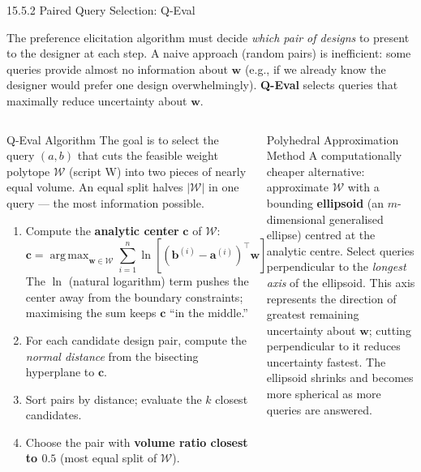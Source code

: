 \documentclass[aspectratio=169,10pt]{beamer}
\newcommand{\bw}{\mathbf{w}}
\newcommand{\ba}{\mathbf{a}}
\newcommand{\bb}{\mathbf{b}}
\DeclareMathOperator*{\argmax}{arg\,max}
\begin{document}
\begin{frame}[allowframebreaks]{15.5.2 Paired Query Selection: Q-Eval}

The preference elicitation algorithm must decide \emph{which pair of designs}
to present to the designer at each step.  A naive approach (random pairs) is
inefficient: some queries provide almost no information about $\bw$ (e.g., if
we already know the designer would prefer one design overwhelmingly).
\textbf{Q-Eval} selects queries that maximally reduce uncertainty about $\bw$.

\begin{columns}
\begin{block}{Q-Eval Algorithm}
  The goal is to select the query $(a, b)$ that cuts the feasible weight
  polytope $\mathcal{W}$ (script W) into two pieces of nearly equal volume.
  An equal split halves $|\mathcal{W}|$ in one query --- the most information
  possible.
  \begin{enumerate}
    \item Compute the \textbf{analytic center} $\mathbf{c}$ of $\mathcal{W}$:
    \[
      \mathbf{c} = \argmax_{\bw \in \mathcal{W}}
      \sum_{i=1}^n \ln\!\left[(\bb^{(i)} - \ba^{(i)})^\top \bw\right]
    \]
    The $\ln$ (natural logarithm) term pushes the center away from the
    boundary constraints; maximising the sum keeps $\mathbf{c}$ ``in the
    middle.''

    \item For each candidate design pair, compute the \emph{normal distance}
      from the bisecting hyperplane to $\mathbf{c}$.

    \item Sort pairs by distance; evaluate the $k$ closest candidates.

    \item Choose the pair with \textbf{volume ratio closest to $0.5$}
      (most equal split of $\mathcal{W}$).
  \end{enumerate}
\end{block}
\begin{block}{Polyhedral Approximation Method}
  A computationally cheaper alternative: approximate $\mathcal{W}$ with a
  bounding \textbf{ellipsoid} (an $m$-dimensional generalised ellipse)
  centred at the analytic centre.  Select queries perpendicular to the
  \emph{longest axis} of the ellipsoid.  This axis represents the direction
  of greatest remaining uncertainty about $\bw$; cutting perpendicular to it
  reduces uncertainty fastest.  The ellipsoid shrinks and becomes more
  spherical as more queries are answered.
\end{block}


\end{columns}
\end{frame}
\end{document}
